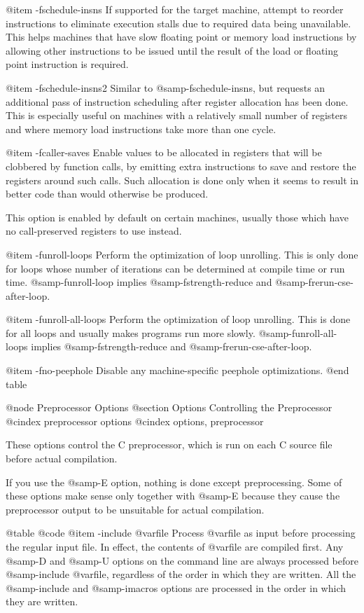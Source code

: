 {@item -fschedule-insns
If supported for the target machine, attempt to reorder instructions to
eliminate execution stalls due to required data being unavailable.  This
helps machines that have slow floating point or memory load instructions
by allowing other instructions to be issued until the result of the load
or floating point instruction is required.

@item -fschedule-insns2
Similar to @samp{-fschedule-insns}, but requests an additional pass of
instruction scheduling after register allocation has been done.  This is
especially useful on machines with a relatively small number of
registers and where memory load instructions take more than one cycle.

@item -fcaller-saves
Enable values to be allocated in registers that will be clobbered by
function calls, by emitting extra instructions to save and restore the
registers around such calls.  Such allocation is done only when it
seems to result in better code than would otherwise be produced.

This option is enabled by default on certain machines, usually those
which have no call-preserved registers to use instead.

@item -funroll-loops
Perform the optimization of loop unrolling.  This is only done for loops
whose number of iterations can be determined at compile time or run time.
@samp{-funroll-loop} implies @samp{-fstrength-reduce} and
@samp{-frerun-cse-after-loop}.

@item -funroll-all-loops
Perform the optimization of loop unrolling.  This is done for all loops
and usually makes programs run more slowly.  @samp{-funroll-all-loops}
implies @samp{-fstrength-reduce} and @samp{-frerun-cse-after-loop}.

@item -fno-peephole
Disable any machine-specific peephole optimizations.
@end table

@node Preprocessor Options
@section Options Controlling the Preprocessor
@cindex preprocessor options
@cindex options, preprocessor

These options control the C preprocessor, which is run on each C source
file before actual compilation.

If you use the @samp{-E} option, nothing is done except preprocessing.
Some of these options make sense only together with @samp{-E} because
they cause the preprocessor output to be unsuitable for actual
compilation.

@table @code
@item -include @var{file}
Process @var{file} as input before processing the regular input file.
In effect, the contents of @var{file} are compiled first.  Any @samp{-D}
and @samp{-U} options on the command line are always processed before
@samp{-include @var{file}}, regardless of the order in which they are
written.  All the @samp{-include} and @samp{-imacros} options are
processed in the order in which they are written.

}
